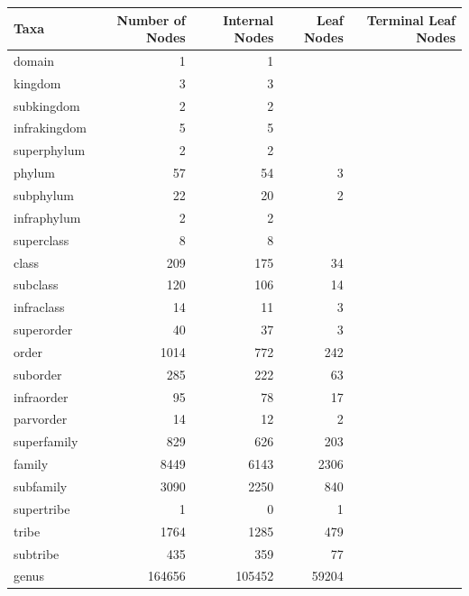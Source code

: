     \begin{table}[h!]
      \begin{center}
        \begin{tabular}{ |l|r||r|r|r| }
          \hline
          \bfseries Taxa & \bfseries Number of Nodes & \bfseries Internal Nodes & \bfseries Leaf Nodes & \bfseries Terminal Leaf Nodes \\
          \hline \hline
          \setrow{\bfseries}domain & 1 & 1 & &  \\ \hline
          \setrow{\bfseries}kingdom & 3 & 3 & &  \\
          subkingdom & 2 & 2 & & \\
          infrakingdom & 5 & 5 & & \\
          superphylum & 2 & 2 & & \\ \hline
          \setrow{\bfseries}phylum & 57 & 54 & 3 & \\
          subphylum & 22 & 20 & 2 & \\
          infraphylum & 2 & 2 & & \\
          superclass & 8 & 8 & & \\ \hline
          \setrow{\bfseries}class & 209 & 175 & 34 & \\
          subclass & 120 & 106 & 14 & \\
          infraclass & 14 & 11 & 3 & \\
          superorder & 40 & 37 & 3 & \\ \hline
          \setrow{\bfseries}order & 1014 & 772 & 242 & \\
          suborder & 285 & 222 & 63 & \\
          infraorder & 95 & 78 & 17 & \\
          parvorder & 14 & 12 & 2 & \\
          superfamily & 829 & 626 & 203 & \\ \hline
          \setrow{\bfseries}family & 8449 & 6143 & 2306 & \\
          subfamily & 3090 & 2250 & 840 & \\
          supertribe & 1 & 0 & 1 & \\
          tribe & 1764 & 1285 & 479 & \\
          subtribe & 435 & 359 & 77 & \\ \hline
          \setrow{\bfseries}genus & 164656 & 105452 & 59204 & \\

\end{tabular}
\end{center}
\end{table}
